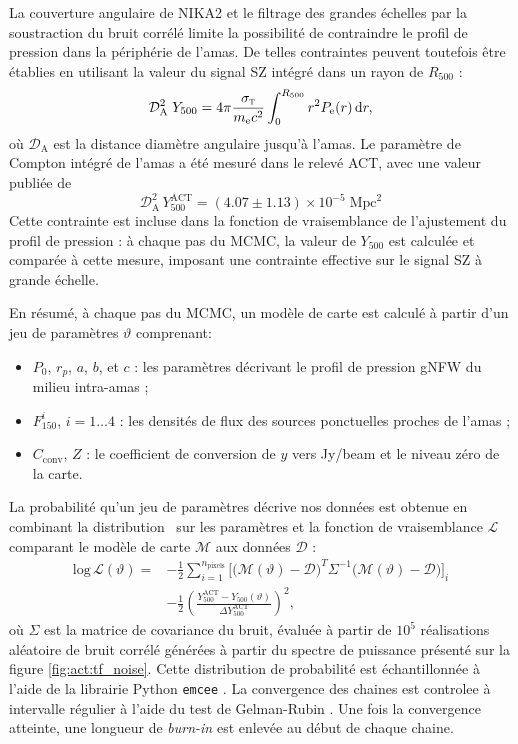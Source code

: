 La couverture angulaire de NIKA2 et le filtrage des grandes échelles par la soustraction du bruit corrélé limite la possibilité de contraindre le profil de pression dans la périphérie de l'amas.
De telles contraintes peuvent toutefois être établies en utilisant la valeur du signal SZ intégré dans un rayon de $R_{500}$ :
\begin{equation}
    \mathcal{D}_\mathrm{A}^2 \; Y_{500} = 4\pi \frac{\sigma_\textsc{t}}{m_{\rm e} c^2}\int_0^{R_{500}} r^2 P_{\rm e}(r) \, \mathrm{d} r,
\end{equation}
où $\mathcal{D}_\mathrm{A}$ est la distance diamètre angulaire jusqu'à l'amas.
Le paramètre de Compton intégré de l'amas a été mesuré dans le relevé ACT, avec une valeur publiée de \cite{hasselfield_atacama_2013}
\begin{equation}
    \mathcal{D}_\mathrm{A}^2 \, Y_{500}^\mathrm{ACT} = (4.07 \pm 1.13) \times 10^{-5} \;\mathrm{Mpc}^2
\end{equation}
Cette contrainte est incluse dans la fonction de vraisemblance de l'ajustement du profil de pression : à chaque pas du MCMC, la valeur de $Y_{500}$ est calculée et comparée à cette mesure, imposant une contrainte effective sur le signal SZ à grande échelle.

En résumé, à chaque pas du MCMC, un modèle de carte est calculé à partir d'un jeu de paramètres $\vartheta$ comprenant:
\begin{itemize}
    \setlength\itemsep{0pt}
    \item $P_0$, $r_p$, $a$, $b$, et $c$ : les paramètres décrivant le profil de pression gNFW du milieu intra-amas ;
    \item $F_{150}^i$, $i = 1 \dots 4$ : les densités de flux des sources ponctuelles proches de l'amas ;
    \item $C_\mathrm{conv},\,Z$ : le coefficient de conversion de $y$ vers Jy/beam et le niveau zéro de la carte.
\end{itemize}
La probabilité qu'un jeu de paramètres décrive nos données est obtenue en combinant la distribution \prior\ sur les paramètres et la fonction de vraisemblance $\mathcal{L}$ comparant le modèle de carte $\mathcal{M}$ aux données $\mathcal{D}$ :
\begin{align}
    \nonumber\mathrm{log}\,\mathcal{L}(\vartheta) =& -\frac{1}{2}\sum_{i=1}^{n_\text{pixels}} \bigg[\Big(\mathcal{M}(\vartheta) - \mathcal{D} \Big)^T \Sigma^{-1} \Big(\mathcal{M}(\vartheta) - \mathcal{D} \Big)\bigg]_i \\
    & - \frac{1}{2} \left(\frac{Y_{500}^\mathrm{ACT} - Y_{500}(\vartheta)}{\Delta Y_{500}^\mathrm{ACT}}\right)^2,
    \label{eq:likelihood}
\end{align}
où $\Sigma$ est la matrice de covariance du bruit, évaluée à partir de $10^5$ réalisations aléatoire de bruit corrélé générées à partir du spectre de puissance présenté sur la figure \ref{fig:act:tf_noise}.
Cette distribution de probabilité est échantillonnée à l'aide de la librairie Python \texttt{emcee} \cite{foreman-mackey_emcee_2019}.
La convergence des chaines est controlee à intervalle régulier à l'aide du test de Gelman-Rubin \cite{gelman_inference_1992}.
Une fois la convergence atteinte, une longueur de \textit{burn-in} est enlevée au début de chaque chaine.

